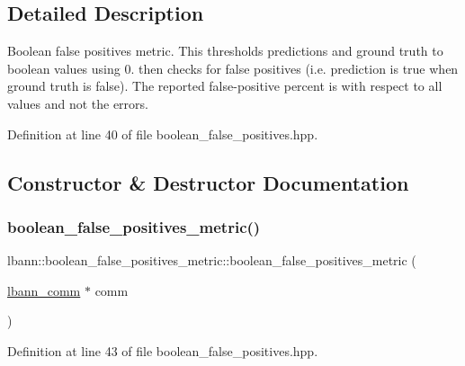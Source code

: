 \subsection{Detailed Description}
Boolean false positives metric. This thresholds predictions and ground truth to boolean values using 0. then checks for false positives (i.\+e. prediction is true when ground truth is false). The reported false-\/positive percent is with respect to all values and not the errors. 

Definition at line 40 of file boolean\+\_\+false\+\_\+positives.\+hpp.



\subsection{Constructor \& Destructor Documentation}
\mbox{\label{classlbann_1_1boolean__false__positives__metric_a47a4ec4bd3cd0d895f3543cd9ee0ea9b}} 
\subsubsection{\texorpdfstring{boolean\+\_\+false\+\_\+positives\+\_\+metric()}{boolean\_false\_positives\_metric()}\hspace{0.1cm}{\footnotesize\ttfamily [1/2]}}
{\footnotesize\ttfamily lbann\+::boolean\+\_\+false\+\_\+positives\+\_\+metric\+::boolean\+\_\+false\+\_\+positives\+\_\+metric (\begin{DoxyParamCaption}\item[{\hyperlink{classlbann_1_1lbann__comm}{lbann\+\_\+comm} $\ast$}]{comm }\end{DoxyParamCaption})\hspace{0.3cm}{\ttfamily [inline]}}



Definition at line 43 of file boolean\+\_\+false\+\_\+positives.\+hpp.


